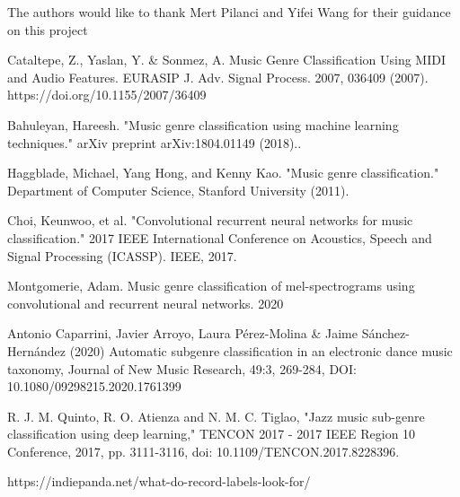 \documentclass[letterpaper, 12 pt, conference]{ieeeconf}  %
\begin{document}
The authors would like to thank Mert Pilanci and Yifei Wang for their guidance on this project



\begin{thebibliography}{99}



 Cataltepe, Z., Yaslan, Y. & Sonmez, A. Music Genre Classification Using MIDI and Audio Features. EURASIP J. Adv. Signal Process. 2007, 036409 (2007). https://doi.org/10.1155/2007/36409

 Bahuleyan, Hareesh. "Music genre classification using machine learning techniques." arXiv preprint arXiv:1804.01149 (2018)..

 Haggblade, Michael, Yang Hong, and Kenny Kao. "Music genre classification." Department of Computer Science, Stanford University (2011). 

 Choi, Keunwoo, et al. "Convolutional recurrent neural networks for music classification." 2017 IEEE International Conference on Acoustics, Speech and Signal Processing (ICASSP). IEEE, 2017.


 Montgomerie, Adam.  Music genre classification of mel-spectrograms using convolutional and
recurrent neural networks. 2020

  Antonio Caparrini, Javier Arroyo, Laura Pérez-Molina & Jaime Sánchez-Hernández (2020) Automatic subgenre classification in an electronic dance music taxonomy, Journal of New Music Research, 49:3, 269-284, DOI: 10.1080/09298215.2020.1761399



 R. J. M. Quinto, R. O. Atienza and N. M. C. Tiglao, "Jazz music sub-genre classification using deep learning," TENCON 2017 - 2017 IEEE Region 10 Conference, 2017, pp. 3111-3116, doi: 10.1109/TENCON.2017.8228396.


 https://indiepanda.net/what-do-record-labels-look-for/


\end{thebibliography}
\end{document}
